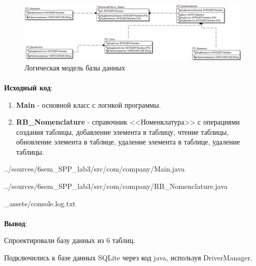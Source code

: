 \documentclass[12pt, a4paper, simple]{eskdtext}
\begin{document}
    \begin{figure}[!h]
        \centering
        \includegraphics[width=16cm]
            {../sources/database/ФМ.png}
        \caption{Логическая модель базы данных}
    \end{figure}

    \paragraph{} \textbf{Исходный код}: 

    \begin{enumerate}
        \item \textbf{Main} - основной класс с логикой программы.
        \item \textbf{RB\_Nomenclature} - справочник <<Номенклатура>> с операциями создания таблицы,
        добавление элемента в таблицу,
        чтение таблицы,
        обновление элемента в таблице,
        удаление элемента в таблице,
        удаление таблицы.
    \end{enumerate}

    
    {../sources/6sem_SPP_lab3/src/com/company/Main.java}

    
    {../sources/6sem_SPP_lab3/src/com/company/RB_Nomenclature.java}

    
    {_assets/console.log.txt}


    \paragraph{} \textbf{Вывод}:
    
    Спроектировали базу данных из 6 таблиц.

    Подключились к базе данных SQLite через код java, используя DriverManager.
\end{document}
